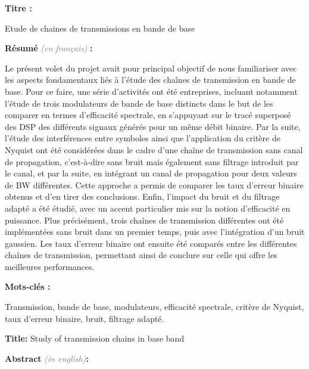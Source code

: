 \documentclass[11pt]{article}
\newcommand{\Gray}[1]{\textcolor{gray}{\textit{#1}}}
\begin{document}
{\bfseries Titre :}

Etude de chaines de transmissions en bande de base

{\bfseries Résumé} \Gray{(en français)} {\bfseries :}

Le présent volet du projet avait pour principal objectif de nous familiariser avec les aspects fondamentaux liés à l'étude des chaînes de transmission en bande de base. Pour ce faire, une série d'activités ont été entreprises, incluant notamment l'étude de trois modulateurs de bande de base distincts dans le but de les comparer en termes d'efficacité spectrale, en s'appuyant sur le tracé superposé des DSP des différents signaux générés pour un même débit binaire. Par la suite, l'étude des interférences entre symboles ainsi que l'application du critère de Nyquist ont été considérées dans le cadre d'une chaîne de transmission sans canal de propagation, c’est-à-dire sans bruit mais également sans filtrage introduit par le canal, et par la suite, en intégrant un canal de propagation pour deux valeurs de BW différentes. Cette approche a permis de comparer les taux d’erreur binaire obtenus et d'en tirer des conclusions. Enfin, l'impact du bruit et du filtrage adapté a été étudié, avec un accent particulier mis sur la notion d'efficacité en puissance. Plus précisément, trois chaînes de transmission différentes ont été implémentées sans bruit dans un premier temps, puis avec l'intégration d'un bruit gaussien. Les taux d'erreur binaire ont ensuite été comparés entre les différentes chaînes de transmission, permettant ainsi de conclure sur celle qui offre les meilleures performances.

{\bfseries Mots-clés :}

Transmission, bande de base, modulateurs, efficacité spectrale, critère de Nyquist, taux d'erreur binaire, bruit, filtrage adapté.

\vspace*{3mm}
\hrulefill
\vspace*{3mm}


{\bfseries Title:}
Study of transmission chains in base band


{\bfseries Abstract} \Gray{(in english)}{\bfseries:}
\end{document}
